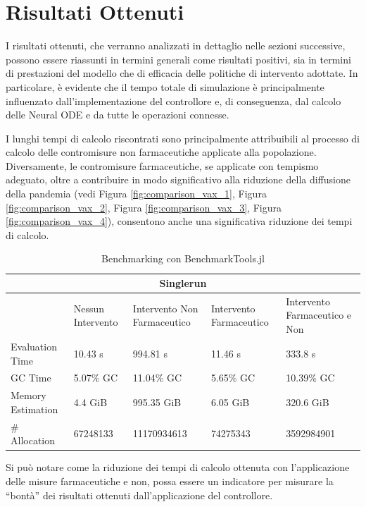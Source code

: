 \section{Risultati Ottenuti}

I risultati ottenuti, che verranno analizzati in dettaglio nelle 
sezioni successive, possono essere riassunti in termini generali come 
risultati positivi, sia in termini di prestazioni del modello che di 
efficacia delle politiche di intervento adottate. In particolare, 
è evidente che il tempo totale di simulazione è principalmente 
influenzato dall'implementazione del controllore e, di conseguenza, 
dal calcolo delle Neural ODE e da tutte le operazioni connesse.

I lunghi tempi di calcolo riscontrati sono principalmente attribuibili 
al processo di calcolo delle contromisure non farmaceutiche applicate 
alla popolazione. Diversamente, le contromisure farmaceutiche, 
se applicate con tempismo adeguato, oltre a contribuire in modo 
significativo alla riduzione della diffusione della pandemia 
(vedi Figura \ref{fig:comparison_vax_1}, Figura 
\ref{fig:comparison_vax_2}, Figura \ref{fig:comparison_vax_3}, 
Figura \ref{fig:comparison_vax_4}), consentono anche una significativa 
riduzione dei tempi di calcolo.

\begin{table}[H]
    \centering
    \caption{Benchmarking con BenchmarkTools.jl \cite{chen2016robust}}
    \begin{tabular}{|p{2.5cm}||p{2.5cm}|p{2.5cm}|p{2.5cm}|p{2.5cm}|}
        \hline
        \multicolumn{5}{|c|}{Singlerun} \\
        \hline
        & Nessun Intervento & Intervento Non Farmaceutico & Intervento Farmaceutico & Intervento Farmaceutico e Non \\
        \hline
        Evaluation Time & 10.43 s & 994.81 s & 11.46 s & 333.8 s \\
        GC Time & 5.07\% GC & 11.04\% GC & 5.65\% GC & 10.39\% GC \\
		Memory Estimation & 4.4 GiB & 995.35 GiB & 6.05 GiB & 320.6 GiB \\
        \# Allocation & 67248133 & 11170934613 & 74275343 & 3592984901 \\
		\hline
    \end{tabular}
\end{table}

Si può notare come la riduzione dei tempi di calcolo ottenuta con l'applicazione delle misure farmaceutiche e non, possa essere un indicatore per misurare la ``bontà'' dei risultati ottenuti dall'applicazione del controllore.

